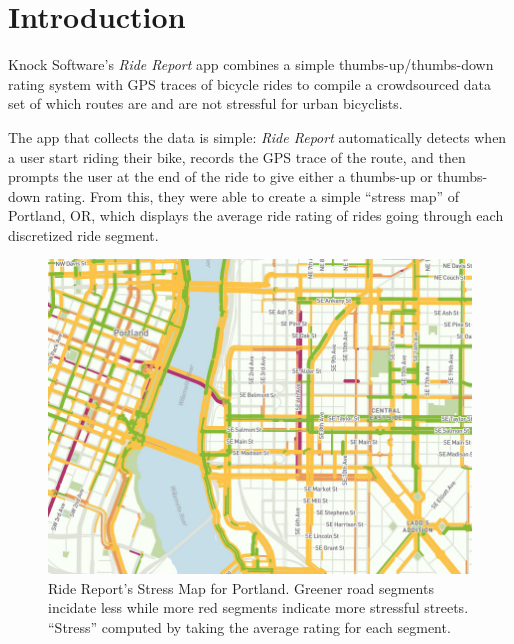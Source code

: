 \documentclass[12pt,twoside]{reedthesis}
\title{}
\author{}
\date{}
\begin{document}
  
  \frontmatter %
  \pagestyle{empty} %

  
  

      \hypersetup{linkcolor=black}
    \setcounter{tocdepth}{1}
    \tableofcontents
  
  
  
  
  
  \mainmatter %
  \pagestyle{fancyplain} %

  \chapter*{Introduction}\label{introduction}
  
  Knock Software's \emph{Ride Report} app combines a simple
  thumbs-up/thumbs-down rating system with GPS traces of bicycle rides to
  compile a crowdsourced data set of which routes are and are not
  stressful for urban bicyclists.
  
  The app that collects the data is simple: \emph{Ride Report}
  automatically detects when a user start riding their bike, records the
  GPS trace of the route, and then prompts the user at the end of the ride
  to give either a thumbs-up or thumbs-down rating. From this, they were
  able to create a simple ``stress map'' of Portland, OR, which displays
  the average ride rating of rides going through each discretized ride
  segment.
  
  \begin{figure}[h!tbp]
  \centering
  \includegraphics[angle = 0,scale = 0.75]{figure/stress_map.jpg}
  \caption[Ride Report's Stress Map for Portland. Greener road segments incidate less
  while more red segments indicate more stressful streets. ``Stress'' computed by
  taking the average rating for each segment.]{\normalsize{Ride Report's Stress Map for Portland. Greener road segments incidate less
  while more red segments indicate more stressful streets. ``Stress'' computed by
  taking the average rating for each segment.}}
  \label{fig:stress-map}
  \end{figure}
  
\end{document}
